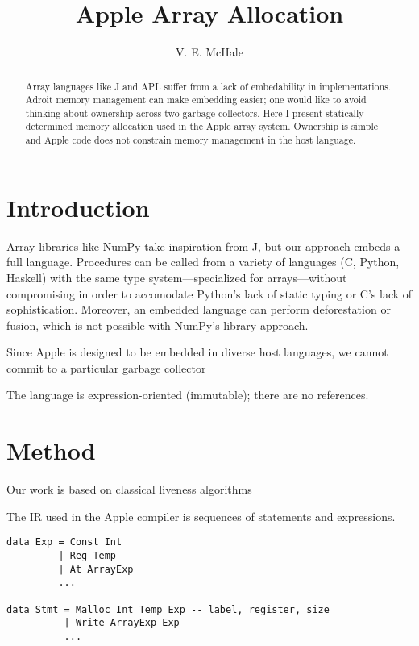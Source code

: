 \documentclass{article}
\begin{document}
\title{Apple Array Allocation}
\author{V. E. McHale}
\maketitle

\begin{abstract}
    Array languages like J and APL suffer from a lack of embedability in implementations. Adroit memory management can make embedding easier; one would like to avoid thinking about ownership across two garbage collectors. Here I present statically determined memory allocation used in the Apple array system. Ownership is simple and Apple code does not constrain memory management in the host language.
\end{abstract}

\section{Introduction}

Array libraries like NumPy take inspiration from J, but our approach embeds a full language. Procedures can be called from a variety of languages (C, Python, Haskell) with the same type system---specialized for arrays---without compromising in order to accomodate Python's lack of static typing or C's lack of sophistication. Moreover, an embedded language can perform deforestation or fusion, which is not possible with NumPy's library approach.

Since Apple is designed to be embedded in diverse host languages, we cannot commit to a particular garbage collector

The language is expression-oriented (immutable); there are no references.

\section{Method}

Our work is based on classical liveness algorithms %


The IR used in the Apple compiler is sequences of statements and expressions.

\begin{verbatim}
data Exp = Const Int
         | Reg Temp
         | At ArrayExp
         ...

data Stmt = Malloc Int Temp Exp -- label, register, size
          | Write ArrayExp Exp
          ...
\end{verbatim}
\end{document}
